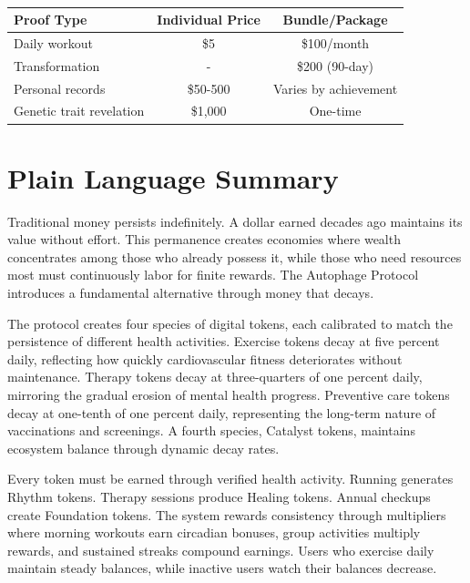 \documentclass[11pt,letterpaper]{article}
\begin{document}
~


\begin{table}[H]
\centering
\begin{tabular}{lcc}
\toprule
\textbf{Proof Type} & \textbf{Individual Price} & \textbf{Bundle/Package} \\
\midrule
Daily workout & \$5 & \$100/month \\
Transformation & - & \$200 (90-day) \\
Personal records & \$50-500 & Varies by achievement \\
Genetic trait revelation & \$1,000 & One-time \\
\bottomrule
\end{tabular}
\end{table}


\section{Plain Language Summary}

Traditional money persists indefinitely. A dollar earned decades ago maintains its value without effort. This permanence creates economies where wealth concentrates among those who already possess it, while those who need resources most must continuously labor for finite rewards. The Autophage Protocol introduces a fundamental alternative through money that decays.

The protocol creates four species of digital tokens, each calibrated to match the persistence of different health activities. Exercise tokens decay at five percent daily, reflecting how quickly cardiovascular fitness deteriorates without maintenance. Therapy tokens decay at three-quarters of one percent daily, mirroring the gradual erosion of mental health progress. Preventive care tokens decay at one-tenth of one percent daily, representing the long-term nature of vaccinations and screenings. A fourth species, Catalyst tokens, maintains ecosystem balance through dynamic decay rates.

Every token must be earned through verified health activity. Running generates Rhythm tokens. Therapy sessions produce Healing tokens. Annual checkups create Foundation tokens. The system rewards consistency through multipliers where morning workouts earn circadian bonuses, group activities multiply rewards, and sustained streaks compound earnings. Users who exercise daily maintain steady balances, while inactive users watch their balances decrease.
\end{document}
